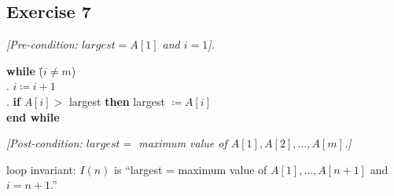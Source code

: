 \documentclass[14pt]{extarticle}
\begin{document}
\subsection{Exercise 7}
{\it [Pre-condition: $largest = A[1]$ and $i = 1$].}

\begin{tabbing}
    {\bf while} \= ($i \neq m$) \\
    . $i \coloneqq i + 1$ \\
    . {\bf if} $A[i] > $ largest {\bf then} largest $\coloneqq A[i]$ \\
    {\bf end while}
\end{tabbing}

{\it [Post-condition: $largest = $ maximum value of $A[1], A[2], \ldots, A[m]$.]}

loop invariant: $I(n)$ is ``largest = maximum value of $A[1], \ldots, A[n+1]$ and $i = n + 1$.''
\end{document}
